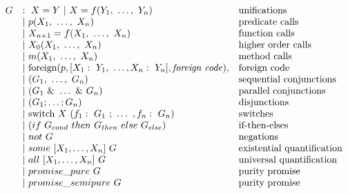 $$
\begin{array}{lll}
G
    & :~ X = Y ~|~ X = f(Y_1,~\ldots,~Y_n)
        & \hbox{unifications}\\
    & |~ p(X_1,~\ldots,~X_n)
        & \hbox{predicate calls} \\
    & |~ X_{n+1} = f(X_1,~\ldots,~X_n)
        & \hbox{function calls} \\
    & |~ X_0(X_1,~\ldots,~X_n)
        & \hbox{higher order calls} \\
    & |~ m(X_1,~\ldots,~X_n)
        & \hbox{method calls} \\
    & |~ \hbox{foreign}(p,
        [X_1:~Y_1,~\ldots,X_n:~Y_n],
        \hbox{\emph{foreign code}}),
        & \hbox{foreign code} \\
    & |~ (G_1,~\ldots,~G_n)
        & \hbox{sequential conjunctions}\\
    & |~ (G_1~\&~\ldots~\&~G_n)
        & \hbox{parallel conjunctions}\\
    & |~ (G_1 ; \ldots ; G_n)
        & \hbox{disjunctions}\\
    & |~ \hbox{switch}~X~(f_1:~G_1~;~\ldots~,f_n:~G_n)
        & \hbox{switches}\\
    & |~ (if~G_{cond}~then~G_{then}~else~G_{else})
        & \hbox{if-then-elses}\\
    & |~ not~G
        & \hbox{negations}\\
    & |~ some~[X_1,\ldots,X_n]~G
        & \hbox{existential quantification}\\
    & |~ all~[X_1,\ldots,X_n]~G
        & \hbox{universal quantification} \\
    & |~ promise\_pure~G
        & \hbox{purity promise}\\
    & |~ promise\_semipure~G
        & \hbox{purity promise}\\
\end{array}
$$

